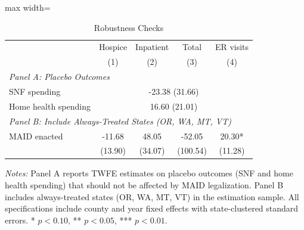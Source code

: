\begin{table}[H]
\centering
\caption{Robustness Checks}
\label{tab:robust}
\begin{adjustbox}{max width=\textwidth}
\begin{threeparttable}
\begin{tabular}{lcccc}
\toprule
& Hospice & Inpatient & Total & ER visits \\
& (1) & (2) & (3) & (4) \\
\midrule
\multicolumn{5}{l}{\textit{Panel A: Placebo Outcomes}} \\
SNF spending & \multicolumn{4}{c}{-23.38 (31.66)} \\
Home health spending & \multicolumn{4}{c}{16.60 (21.01)} \\
\midrule
\multicolumn{5}{l}{\textit{Panel B: Include Always-Treated States (OR, WA, MT, VT)}} \\
MAID enacted & -11.68 & 48.05 & -52.05 & 20.30* \\
 & (13.90) & (34.07) & (100.54) & (11.28) \\
\bottomrule
\end{tabular}
\begin{tablenotes}[flushleft]
\scriptsize
\item \textit{Notes:} Panel A reports TWFE estimates on placebo outcomes (SNF and home health spending) that should not be affected by MAID legalization. Panel B includes always-treated states (OR, WA, MT, VT) in the estimation sample. All specifications include county and year fixed effects with state-clustered standard errors. * $p<0.10$, ** $p<0.05$, *** $p<0.01$.
\end{tablenotes}
\end{threeparttable}
\end{adjustbox}
\end{table}
